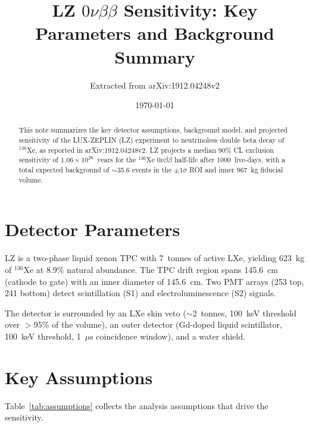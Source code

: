 \documentclass[11pt]{article}
\title{LZ $0\nu\beta\beta$ Sensitivity: Key Parameters and Background Summary}
\author{Extracted from arXiv:1912.04248v2}
\date{\today}
\begin{document}
\maketitle

\begin{abstract}
This note summarizes the key detector assumptions, background model,
and projected sensitivity of the LUX-ZEPLIN (LZ) experiment to
neutrinoless double beta decay of $^{136}$Xe, as reported in
arXiv:1912.04248v2. LZ projects a median 90\% CL exclusion
sensitivity of $1.06 \times 10^{26}$~years for the $^{136}$Xe
$0\nu\beta\beta$ half-life after 1000~live-days, with a total
expected background of $\sim$35.6 events in the $\pm 1\sigma$ ROI
and inner 967~kg fiducial volume.
\end{abstract}

\section{Detector Parameters}

LZ is a two-phase liquid xenon TPC with 7~tonnes of active LXe,
yielding 623~kg of $^{136}$Xe at 8.9\% natural abundance.  The TPC
drift region spans 145.6~cm (cathode to gate) with an inner diameter
of 145.6~cm.  Two PMT arrays (253 top, 241 bottom) detect
scintillation (S1) and electroluminescence (S2) signals.

The detector is surrounded by an LXe skin veto ($\sim$2~tonnes,
100~keV threshold over $>$95\% of the volume), an outer detector
(Gd-doped liquid scintillator, 100~keV threshold, 1~$\mu$s
coincidence window), and a water shield.

\section{Key Assumptions}

Table~\ref{tab:assumptions} collects the analysis assumptions that
drive the sensitivity.
\end{document}
